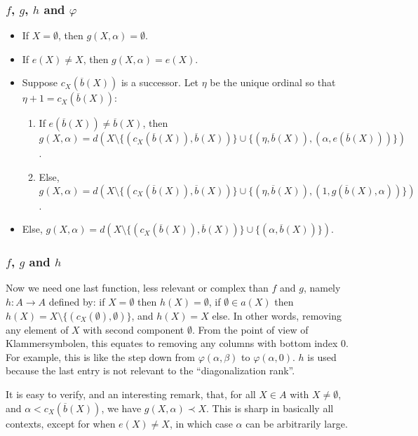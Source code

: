 \documentclass{beamer}
\begin{document}
\begin{frame}
\frametitle{$f$, $g$, $h$ and $\varphi$}
\begin{itemize}
    \item If $X = \emptyset$, then $g(X, \alpha) = \emptyset$.
    \item If $e(X) \neq X$, then $g(X, \alpha) = e(X)$.
    \item Suppose $c_X(\overline{b}(X))$ is a successor. Let $\eta$ be the unique ordinal so that $\eta + 1 = c_X(\overline{b}(X))$:
    \begin{enumerate}
        \item If $e(\overline{b}(X)) \neq \overline{b}(X)$, then $g(X, \alpha) = d(X \setminus \{(c_X(\overline{b}(X)), \overline{b}(X))\} \cup \{(\eta, \overline{b}(X)), (\alpha, e(\overline{b}(X)))\})$.
        \item Else, $g(X, \alpha) = d(X \setminus \{(c_X(\overline{b}(X)), \overline{b}(X))\} \cup \{(\eta, \overline{b}(X)), (1, g(\overline{b}(X), \alpha))\})$.
    \end{enumerate}
    \item Else, $g(X, \alpha) = d(X \setminus \{(c_X(\overline{b}(X)), \overline{b}(X))\} \cup \{(\alpha, \overline{b}(X))\})$.
\end{itemize}
\end{frame}

\begin{frame}
\frametitle{$f$, $g$ and $h$}
Now we need one last function, less relevant or complex than $f$ and $g$, namely $h: A \to A$ defined by: if $X = \emptyset$ then $h(X) = \emptyset$, if $\emptyset \in a(X)$ then $h(X) = X \setminus \{(c_X(\emptyset), \emptyset)\}$, and $h(X) = X$ else. \pause In other words, removing any element of $X$ with second component $\emptyset$. From the point of view of Klammersymbolen, this equates to removing any columns with bottom index $0$. For example, this is like the step down from $\varphi(\alpha, \beta)$ to $\varphi(\alpha, 0)$. $h$ is used because the last entry is not relevant to the ``diagonalization rank''.

\pause

It is easy to verify, and an interesting remark, that, for all $X \in A$ with $X \neq \emptyset$, and $\alpha < c_X(\overline{b}(X))$, we have $g(X, \alpha) \prec X$. This is sharp in basically all contexts, except for when $e(X) \neq X$, in which case $\alpha$ can be arbitrarily large.
\end{frame}
\end{document}
